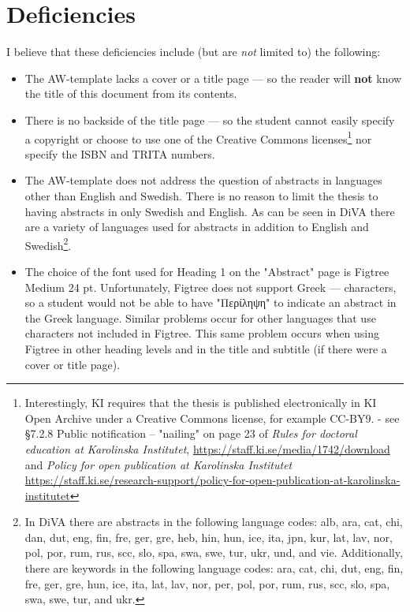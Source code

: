 \documentclass[12pt, twoside]{article}
\begin{document}
\section{Deficiencies}
I believe that these deficiencies include (but are \textit{not} limited to) the following:
\begin{itemize}[label=\color{red}]
  \item The AW-template lacks a cover or a title page --- so the reader will \textbf{not} know the title of this document from its contents.
  
\item There is no backside of the title page --- so the student cannot easily specify a copyright or choose to use one of the Creative Commons licenses\footnote{Interestingly, \gls{KI} requires that the thesis is published
electronically in \gls{KI} Open Archive under a Creative Commons license, for example CC-BY9. - see  §7.2.8 Public notification – "nailing" on page 23 of \textit{Rules for doctoral education at Karolinska Institutet}, \url{https://staff.ki.se/media/1742/download} and \textit{Policy for open publication at Karolinska Institutet} \url{https://staff.ki.se/research-support/policy-for-open-publication-at-karolinska-institutet}} nor specify the \gls{ISBN} and TRITA numbers.

\item The AW-template does not address the question of abstracts in languages other than English and Swedish. There is no reason to limit the thesis to having abstracts in only Swedish and English. As can be seen in \gls{DiVA} there are a variety of languages used for abstracts in addition to English and Swedish\footnote{In \gls{DiVA} there are abstracts in the following language codes: alb, ara, cat, chi, dan, dut, eng, fin, fre, ger, gre, heb, hin, hun, ice, ita, jpn, kur, lat, lav, nor, pol, por, rum, rus, scc, slo, spa, swa, swe, tur, ukr, und, and vie. Additionally, there are keywords in the following language codes: ara, cat, chi, dut, eng, fin, fre, ger, gre, hun, ice, ita, lat, lav, nor, per, pol, por, rum, rus, scc, slo, spa, swa, swe, tur, and ukr.}{}.

\item The choice of the font used for Heading 1 on the "Abstract" page is Figtree Medium 24 pt. Unfortunately, Figtree does not support Greek --- characters, so a student would not be able to have "{\NotoSansFont Περίληψη}" to indicate an abstract in the Greek language. Similar problems occur for other languages that use characters not included in Figtree. This same problem occurs when using Figtree in other heading levels and in the title and subtitle (if there were a cover or title page).
\end{itemize}
\end{document}
